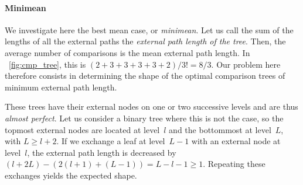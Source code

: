 \paragraph{Minimean}
\label{par:opt_sort:minimean}

We investigate here the best mean case, or \emph{minimean}. Let us
call the sum of the lengths of all the external paths the
\emph{external path length of the
  tree}\label{sorting__external_path_length}. Then, the average number of comparisons
is the mean external path length. In \fig~\vref{fig:cmp_tree}, this is
\((2+3+3+3+3+2)/3!=8/3\). Our problem here therefore consists in
determining the shape of the optimal comparison trees of minimum
external path length.

These trees have their external nodes on one or two successive levels
and are thus \emph{almost perfect}. Let us consider a binary tree where this is not the case, so
the topmost external nodes are located at level~\(l\) and the
bottommost at level~\(L\), with \(L \geqslant l + 2\). If we exchange
a leaf at level~\(L-1\) with an external node at level~\(l\), the
external path length is decreased by \((l+2L) - (2(l+1) + (L-1)) = L -
l - 1 \geqslant 1\). Repeating these exchanges yields the expected
shape.

